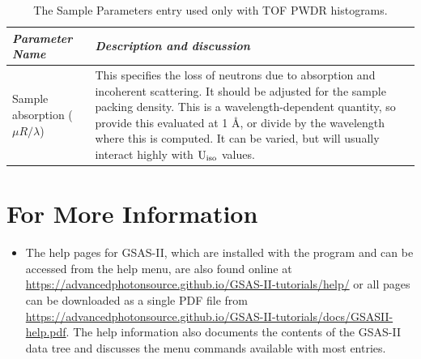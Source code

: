 \begin{table}
\centering
\caption{The Sample Parameters entry used only with TOF PWDR histograms.}
\label{tab:SpecialSample3}
\begin{tabular}{| l | p{} |}
\hline
\textit{Parameter Name} & \textit{Description and discussion} \\
\hline
Sample absorption ($\mu R/ \lambda$) & This specifies the loss of neutrons due to absorption and incoherent scattering. It should be adjusted for the sample packing density. This is a wavelength-dependent quantity, so provide this evaluated at 1 \AA, or divide by the wavelength where this is computed. It can be varied, but will usually interact highly with $\rm U_{iso}$ values. \\
\hline
\end{tabular}
\end{table}



\clearpage
\section{For More Information}

\begin{itemize}
\item The help pages for GSAS-II, which are installed with the program and can be accessed from the help menu, are also found online at \url{https://advancedphotonsource.github.io/GSAS-II-tutorials/help/} or all pages can be downloaded as a single PDF file from \url{https://advancedphotonsource.github.io/GSAS-II-tutorials/docs/GSASII-help.pdf}. The help information also documents the contents of the GSAS-II data tree and discusses the menu commands available with most entries. 

\end{itemize}
